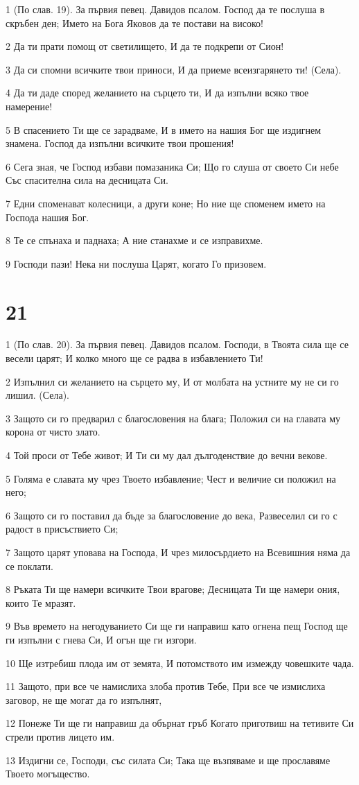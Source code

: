 \par 1 (По слав. 19). За първия певец. Давидов псалом. Господ да те послуша в скръбен ден; Името на Бога Яковов да те постави на високо!
\par 2 Да ти прати помощ от светилището, И да те подкрепи от Сион!
\par 3 Да си спомни всичките твои приноси, И да приеме всеизгарянето ти! (Села).
\par 4 Да ти даде според желанието на сърцето ти, И да изпълни всяко твое намерение!
\par 5 В спасението Ти ще се зарадваме, И в името на нашия Бог ще издигнем знамена. Господ да изпълни всичките твои прошения!
\par 6 Сега зная, че Господ избави помазаника Си; Що го слуша от своето Си небе Със спасителна сила на десницата Си.
\par 7 Едни споменават колесници, а други коне; Но ние ще споменем името на Господа нашия Бог.
\par 8 Те се спънаха и паднаха; А ние станахме и се изправихме.
\par 9 Господи пази! Нека ни послуша Царят, когато Го призовем.

\chapter{21}

\par 1 (По слав. 20). За първия певец. Давидов псалом. Господи, в Твоята сила ще се весели царят; И колко много ще се радва в избавлението Ти!
\par 2 Изпълнил си желанието на сърцето му, И от молбата на устните му не си го лишил. (Села).
\par 3 Защото си го предварил с благословения на блага; Положил си на главата му корона от чисто злато.
\par 4 Той проси от Тебе живот; И Ти си му дал дългоденствие до вечни векове.
\par 5 Голяма е славата му чрез Твоето избавление; Чест и величие си положил на него;
\par 6 Защото си го поставил да бъде за благословение до века, Развеселил си го с радост в присъствието Си;
\par 7 Защото царят уповава на Господа, И чрез милосърдието на Всевишния няма да се поклати.
\par 8 Ръката Ти ще намери всичките Твои врагове; Десницата Ти ще намери ония, които Те мразят.
\par 9 Във времето на негодуванието Си ще ги направиш като огнена пещ Господ ще ги изпълни с гнева Си, И огън ще ги изгори.
\par 10 Ще изтребиш плода им от земята, И потомството им измежду човешките чада.
\par 11 Защото, при все че намислиха злоба против Тебе, При все че измислиха заговор, не ще могат да го изпълнят,
\par 12 Понеже Ти ще ги направиш да обърнат гръб Когато приготвиш на тетивите Си стрели против лицето им.
\par 13 Издигни се, Господи, със силата Си; Така ще възпяваме и ще прославяме Твоето могъщество.

